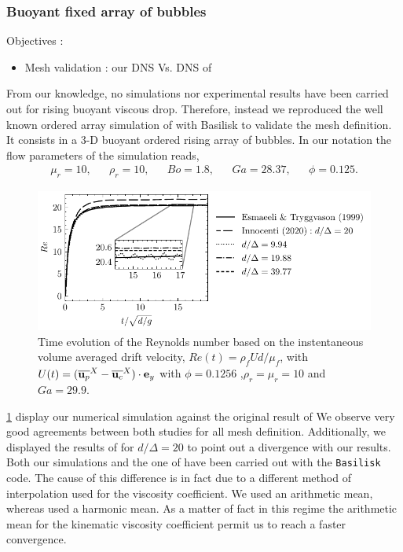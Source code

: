 \subsubsection{Buoyant fixed array of bubbles}
Objectives :
\begin{itemize}
    \item Mesh validation : our DNS Vs. DNS of \cite{esmaeeli1999direct}
\end{itemize}
From our knowledge, no simulations nor experimental results have been carried out for rising buoyant viscous drop. 
Therefore, instead we reproduced the well known ordered array simulation of \citet{esmaeeli1999direct} with Basilisk to validate the mesh definition.  
It consists in a 3-D buoyant ordered rising array of bubbles. 
In our notation the flow parameters of the simulation reads, 
\begin{align*}
    \mu_r = 10,
    && \rho_r = 10,
    && Bo = 1.8,
    && Ga = 28.37,
    && \phi = 0.125.
\end{align*}
\begin{figure}[h!]
    \centering
    \includegraphics[height = 0.35\textwidth]{image/VALIDATION2.0/Loisy/Re.pdf}
    \caption{Time evolution of the Reynolds number based on the instentaneous volume averaged drift velocity, $Re(t) = \rho_fU d /\mu_f$, with $U(t) = (\overline{\textbf{u}_p}^X - \overline{\textbf{u}_c}^X)\cdot \textbf{e}_y$ with $\phi = 0.1256$ ,$\rho_r =\mu_r =10$ and $Ga = 29.9$.}
    \label{fig:ordered_array}
\end{figure}
\ref{fig:ordered_array} display our numerical simulation against the original result of \citet{esmaeeli1999direct}
We observe very good agreements between both studies for all mesh definition.
Additionally, we displayed the results of \citet{innocenti2020direct} for $d/\Delta = 20$ to point out a divergence with our results.  
Both our simulations and the one of \citet{innocenti2020direct} have been carried out with the  \texttt{Basilisk} code. 
The cause of this difference is in fact due to a different method of interpolation used for the viscosity coefficient. 
We used an arithmetic mean, whereas \citet{innocenti2020direct} used a 
harmonic mean. 
As a matter of fact in this regime the arithmetic mean for the kinematic viscosity coefficient permit us to reach a faster convergence. 

